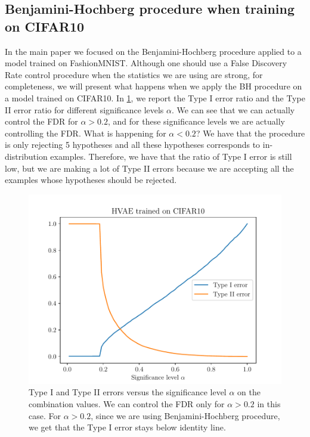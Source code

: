 {\subsection{Benjamini-Hochberg procedure when training on CIFAR10}
\label{appendix_modelagnostic:BH_cifar}
In the main paper we focused on the Benjamini-Hochberg procedure applied to a model trained on FashionMNIST. Although one should use a False Discovery Rate control procedure when the statistics we are using are strong, for completeness, we will present what happens when we apply the BH procedure on a model trained on CIFAR10. In \cref{fig_modelagnostic:type1_cifar}, we report the Type I error ratio and the Type II error ratio for different significance levels $\alpha$. We can see that we can actually control the FDR for $\alpha > 0.2$, and for these significance levels we are actually controlling the FDR. What is happening for $\alpha < 0.2$? We have that the procedure is only rejecting 5 hypotheses and all these hypotheses corresponds to in-distribution examples. Therefore, we have that the ratio of Type I error is still low, but we are making a lot of Type II errors because we are accepting all the examples whose hypotheses should be rejected.

\begin{figure}[tb]
    \centering
    \includegraphics[scale=0.5]{graphics/paper_modelagnostic/cifar_hvae_type1_correct_font.pdf}
    \caption[Type I and Type II errors versus the significance level $\alpha$ on the combination values.]{Type I and Type II errors versus the significance level $\alpha$ on the combination values. We can control the FDR only for $\alpha > 0.2$ in this case. For $\alpha >0.2$, since we are using Benjamini-Hochberg procedure, we get that the Type I error stays below identity line.}
    \label{fig_modelagnostic:type1_cifar}
    \vspace*{-\baselineskip}
\end{figure}     

}
